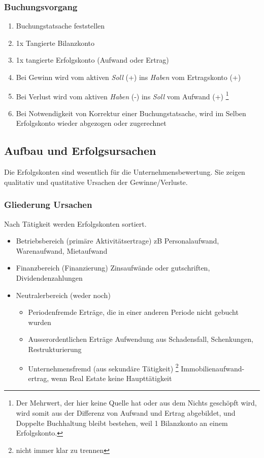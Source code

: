 \subsubsection{Buchungsvorgang}
\begin{enumerate}
    \item Buchungstatsache feststellen
    \item 1x Tangierte Bilanzkonto
    \item 1x tangierte Erfolgskonto (Aufwand oder Ertrag)
    \item Bei Gewinn wird vom aktiven \textit{Soll} (+) ins \textit{Haben} vom Ertragskonto (+) 
    \item Bei Verlust wird vom aktiven \textit{Haben} (-) ins \textit{Soll} vom Aufwand (+) \footnote{Der Mehrwert, der hier keine Quelle hat oder aus dem Nichts geschöpft wird, wird somit aus der Differenz von Aufwand und Ertrag abgebildet, und Doppelte Buchhaltung bleibt bestehen, weil 1 Bilanzkonto an einem Erfolgskonto.}
    \item Bei Notwendigkeit von Korrektur einer Buchungstatsache, wird im Selben Erfolgskonto wieder abgezogen oder zugerechnet

\end{enumerate}
\subsection{Aufbau und Erfolgsursachen}
Die Erfolgskonten sind wesentlich für die Unternehmensbewertung. Sie zeigen qualitativ und quatitative Ursachen der Gewinne/Verluste.

\subsubsection{Gliederung Ursachen}
Nach Tätigkeit werden Erfolgskonten sortiert.
\begin{itemize}
    \item Betriebsbereich (primäre Aktivitätsertrage)
    \subitem zB Personalaufwand, Warenaufwand, Mietaufwand 
    \item Finanzbereich (Finanzierung)
    \subitem Zinsaufwände oder gutschriften, Dividendenzahlungen
    \item Neutralerbereich (weder noch)
    \begin{itemize}
        \item Periodenfremde Erträge, die in einer anderen Periode nicht gebucht wurden
        \item Ausserordentlichen Erträge
        \subitem Aufwendung aus Schadensfall, Schenkungen, Restrukturierung 
        \item Unternehmensfremd (aus sekundäre Tätigkeit) \footnote{nicht immer klar zu trennen}
        \subitem Immobilienaufwand- ertrag, wenn Real Estate keine Haupttätigkeit
    \end{itemize} 
\end{itemize}

